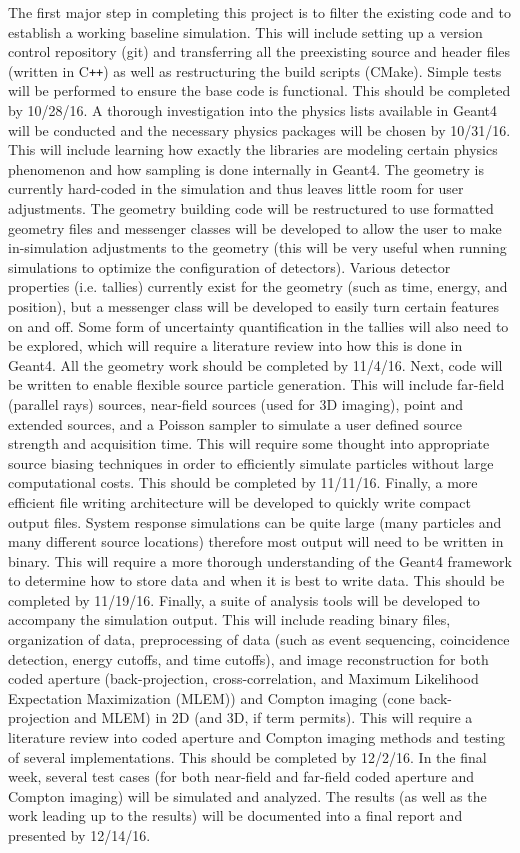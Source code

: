 \documentclass[10pt]{article}
\begin{document}
The first major step in completing this project is to filter the existing code and to establish a working baseline simulation. This will include setting up a version control repository (git) and transferring all the preexisting source and header files (written in C\texttt{++}) as well as restructuring the build scripts (CMake). Simple tests will be performed to ensure the base code is functional. This should be completed by 10/28/16. A thorough investigation into the physics lists available in Geant4 will be conducted and the necessary physics packages will be chosen by 10/31/16. This will include learning how exactly the libraries are modeling certain physics phenomenon and how sampling is done internally in Geant4. The geometry is currently hard-coded in the simulation and thus leaves little room for user adjustments. The geometry building code will be restructured to use formatted geometry files and messenger classes will be developed to allow the user to make in-simulation adjustments to the geometry (this will be very useful when running simulations to optimize the configuration of detectors). Various detector properties (i.e. tallies) currently exist for the geometry (such as time, energy, and position), but a messenger class will be developed to easily turn certain features on and off.  Some form of uncertainty quantification in the tallies will also need to be explored, which will require a literature review into how this is done in Geant4. All the geometry work should be completed by 11/4/16. Next, code will be written to enable flexible source particle generation. This will include far-field (parallel rays) sources, near-field sources (used for 3D imaging), point and extended sources, and a Poisson sampler to simulate a user defined source strength and acquisition time. This will require some thought into appropriate source biasing techniques in order to efficiently simulate particles without large computational costs. This should be completed by 11/11/16. Finally, a more efficient file writing architecture will be developed to quickly write compact output files. System response simulations can be quite large (many particles and many different source locations) therefore most output will need to be written in binary. This will require a more thorough understanding of the Geant4 framework to determine how to store data and when it is best to write data. This should be completed by 11/19/16. Finally, a suite of analysis tools will be developed to accompany the simulation output. This will include reading binary files, organization of data, preprocessing of data (such as event sequencing, coincidence detection, energy cutoffs, and time cutoffs), and image reconstruction for both coded aperture (back-projection, cross-correlation, and Maximum Likelihood Expectation Maximization (MLEM)) and Compton imaging (cone back-projection and MLEM) in 2D (and 3D, if term permits). This will require a literature review into coded aperture and Compton imaging methods and testing of several implementations. This should be completed by 12/2/16. In the final week, several test cases (for both near-field and far-field coded aperture and Compton imaging) will be simulated and analyzed. The results (as well as the work leading up to the results) will be documented into a final report and presented by 12/14/16.
\end{document}
